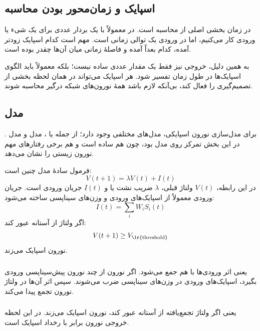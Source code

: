 \subsection{اسپایک و زمان‌محور بودن محاسبه}
در  زمان بخشی اصلی از محاسبه است. در  معمولاً با یک بردار عددی برای یک شیء یا ورودی کار می‌کنیم، اما در  ورودی یک توالی زمانی است. مهم است کدام اسپایک زودتر آمده، کدام بعداً آمده و فاصلهٔ زمانی میان آن‌ها چقدر بوده است.

به همین دلیل، خروجی  نیز فقط یک مقدار عددی ساده نیست؛ بلکه معمولاً باید الگوی اسپایک‌ها در طول زمان تفسیر شود. هر اسپایک می‌تواند در همان لحظه بخشی از تصمیم‌گیری را فعال کند، بی‌آنکه لازم باشد همهٔ نورون‌های شبکه درگیر محاسبه شوند.

\subsection{مدل }
برای مدل‌سازی نورون اسپایکی، مدل‌های مختلفی وجود دارد؛ از جمله  یا ، مدل  و مدل . در این بخش تمرکز روی مدل  بود، چون هم ساده است و هم برخی رفتارهای مهم نورون زیستی را نشان می‌دهد.

فرمول سادهٔ مدل چنین است:
\[
V(t+1) = \lambda V(t) + I(t)
\]
در این رابطه، \(V(t)\) ولتاژ قبلی، \(\lambda\) ضریب نشت یا  و \(I(t)\) جریان ورودی است. جریان ورودی معمولاً از اسپایک‌های ورودی و وزن‌های سیناپسی ساخته می‌شود:
\[
I(t) = \sum_i W_i S_i(t)
\]
اگر ولتاژ از آستانه عبور کند:
\[
V(t+1) \geq V_{\text{\lr{threshold}}}
\]
نورون اسپایک می‌زند.


\subsubsection{}
 یعنی اثر ورودی‌ها با هم جمع می‌شود. اگر نورون از چند نورون پیش‌سیناپسی ورودی بگیرد، اسپایک‌های ورودی در وزن‌های سیناپسی ضرب می‌شوند. سپس اثر آن‌ها در ولتاژ نورون تجمع پیدا می‌کند.

\subsubsection{}
 یعنی اگر ولتاژ تجمع‌یافته از آستانه عبور کند، نورون اسپایک می‌زند. در این لحظه خروجی نورون برابر با رخداد اسپایک است.

